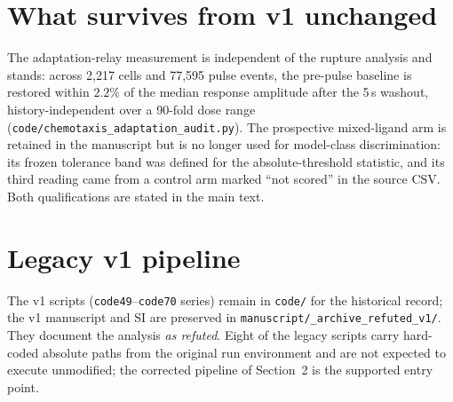 \documentclass[11pt]{article}
\begin{document}
\section{What survives from v1 unchanged}

The adaptation-relay measurement is independent of the rupture analysis and stands: across 2,217
cells and 77,595 pulse events, the pre-pulse baseline is restored within $2.2\%$ of the median
response amplitude after the 5\,s washout, history-independent over a 90-fold dose range
(\texttt{code/chemotaxis\_adaptation\_audit.py}). The prospective mixed-ligand arm is retained in
the manuscript but is no longer used for model-class discrimination: its frozen tolerance band was
defined for the absolute-threshold statistic, and its third reading came from a control arm marked
``not scored'' in the source CSV. Both qualifications are stated in the main text.

\section{Legacy v1 pipeline}

The v1 scripts (\texttt{code49}--\texttt{code70} series) remain in \texttt{code/} for the
historical record; the v1 manuscript and SI are preserved in
\texttt{manuscript/\_archive\_refuted\_v1/}. They document the analysis \emph{as refuted}. Eight of
the legacy scripts carry hard-coded absolute paths from the original run environment and are not
expected to execute unmodified; the corrected pipeline of Section~2 is the supported entry point.
\end{document}
